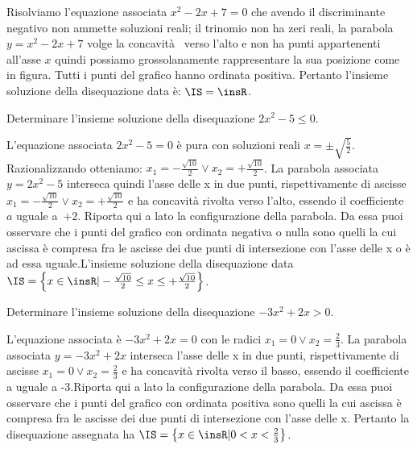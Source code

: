 \begin{exrig}
\begin{esempio}
\begin{itemize}
Risolviamo l'equazione associata $x^2-2x+7=0$ che avendo il discriminante 
negativo non ammette soluzioni reali; il trinomio non ha zeri reali, la parabola 
$y=x^2-2x+7$ volge la concavità  verso l'alto e non ha punti appartenenti 
all'asse $x$ quindi possiamo grossolanamente rappresentare la sua posizione  
come in figura. Tutti i punti del grafico hanno ordinata positiva. Pertanto 
l'insieme soluzione della disequazione data è: $\IS=\insR$.
\end{itemize}
\begin{center}
 
\end{center}
\end{esempio}

% 
% 
% 

\begin{esempio}
Determinare l'insieme soluzione della disequazione $2x^2-5\le 0$.

L'equazione associata $2x^2-5=0$ è pura con soluzioni reali $x=\pm \sqrt{\frac 
5 2}$. Razionalizzando otteniamo: $x_1=-\frac{\sqrt{10}} 2\vee 
x_2=+\frac{\sqrt{10}} 2$. La parabola associata $y=2x^2-5$ interseca quindi 
l'asse delle x in due punti, rispettivamente di ascisse 
$x_1=-\frac{\sqrt{10}} 2\vee x_2=+\frac{\sqrt{10}} 2$ 
e ha concavità rivolta verso l'alto, essendo il coefficiente~$a$ uguale a~$+2$.
Riporta qui a lato la configurazione della parabola.
Da essa puoi osservare che i punti del grafico con ordinata negativa o nulla 
sono quelli la cui ascissa è compresa fra le ascisse dei due punti di 
intersezione con l'asse delle x o è ad essa uguale.L'insieme soluzione della 
disequazione data 
 $\IS=\left\{x\in \insR | -\frac{\sqrt{10}} 2\le x\le +\frac{\sqrt{10}} 
2\right\}$.
\end{esempio}


\begin{esempio}
Determinare l'insieme soluzione della disequazione $-3x^2+2x>0$.

L'equazione associata è $-3x^2+2x=0$ con le radici $x_1=0\vee x_2=\frac 2 3$. 
La parabola associata $y=-3x^2+2x$ interseca l'asse delle x in due punti, 
rispettivamente di ascisse $x_1=0\vee x_2=\frac 2 3$ e ha concavità rivolta 
verso il basso, essendo il coefficiente a uguale a -3.Riporta qui a lato la 
configurazione della parabola.
Da essa puoi osservare che i punti del grafico con ordinata positiva sono quelli 
la cui ascissa è compresa fra le ascisse dei due punti di intersezione con 
l'asse delle x.
Pertanto la disequazione assegnata ha $\IS=\left\{x\in \insR | 0<x<\frac 2 
3\right\}$.
\end{esempio}

\end{exrig}

